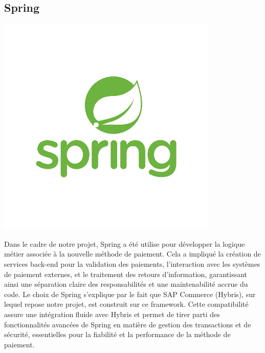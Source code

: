 \subsection*{Spring}
\begin{center}
    \centering
    \includegraphics[scale=0.4]{Figures/spring.png}
    \label{fig:processus}
\end{center} 

Dans le cadre de notre projet, Spring a été utilise pour développer la logique métier associée à la nouvelle méthode de paiement. Cela a impliqué la création de services back-end pour la validation des paiements, l'interaction avec les systèmes de paiement externes, et le traitement des retours d'information, garantissant ainsi une séparation claire des responsabilités et une maintenabilité accrue du code. Le choix de Spring s’explique par le fait que SAP Commerce (Hybris), sur lequel repose notre projet, est construit sur ce framework. Cette compatibilité assure une intégration fluide avec Hybris et permet de tirer parti des fonctionnalités avancées de Spring en matière de gestion des transactions et de sécurité, essentielles pour la fiabilité et la performance de la méthode de paiement.
